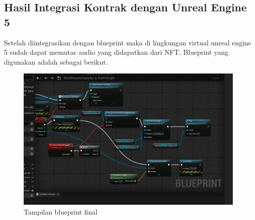 \subsection{Hasil Integrasi Kontrak dengan Unreal Engine 5}

Setelah diintegrasikan dengan blueprint maka di lingkungan virtual unreal engine 5 sudah dapat memutar audio yang didapatkan dari NFT.
Blueprint yang digunakan adalah sebagai berikut.

\begin{figure}[H]
  \centering

  \includegraphics[scale=0.35]{gambar/blueprintfinal.jpg}

  \caption{Tampilan blueprint final}
  \label{fig:blueprintfinal}
\end{figure}
